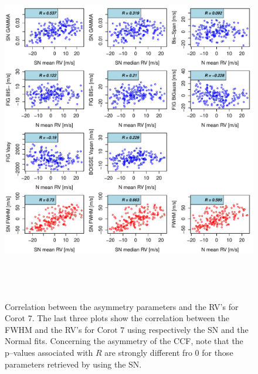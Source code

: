 \documentclass{aa}
\begin{document}
\begin{figure}[htbp]
\begin{center}
\includegraphics[height = 6in]{LRa01_E_[4]Comparison_para.pdf} 
   \caption{Correlation between the asymmetry parameters and the RV's for  $\text{Corot }7$. The last three plots show the correlation between the FWHM and the RV's for  $\text{Corot }7$ using respectively the SN and the Normal fits. Concerning the asymmetry of the CCF, note that the p--values associated with $R$ are strongly different fro $0$ for those parameters retrieved by using the SN.}
   \label{fig:Corot7:corrPlot}
\end{center}
\end{figure}
\end{document}
